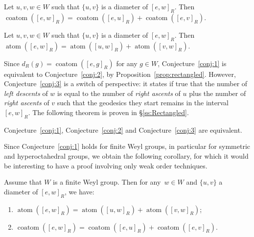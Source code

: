 \documentclass[Unicode]{cedram-alco}
\theoremstyle{definition}
\newcommand{\coatom}{\operatorname{coatom}}
\newcommand{\atom}{\operatorname{atom}}
\begin{document}
\begin{conj}\label{conj:2} Let $u,v,w\in W$ such that $\{u,v\}$ is a diameter of $[e,w]_R$. Then $\coatom([e,w]_R)= \coatom([e,u]_R) + \coatom([e,v]_R)$.
\end{conj} 

\begin{conj}\label{conj:3} Let $u,v,w\in W$ such that $\{u,v\}$ is a diameter of $[e,w]_R$. Then $\atom([e,w]_R)= \atom([u,w]_R) + \atom([v,w]_R)$.
\end{conj} 

Since $d_R(g)=\coatom([e,g]_R)$ for any $g\in W$, Conjecture~\ref{conj:1} is equivalent to Conjecture~\ref{conj:2}, by Proposition~\ref{prop:rectangled}. However, Conjecture~\ref{conj:3} is a switch of perspective: it states if true that the number of {\em left descents} of $w$ is equal to the number of {\em right ascents} of $u$ plus the number of {\em right ascents} of $v$ such that the geodesics they start remains in the interval $[e,w]_R$. The following theorem is proven in \S\ref{ss:Rectangled}.

\begin{thm}\label{thm:Equivalent} Conjecture~\ref{conj:1}, Conjecture~\ref{conj:2} and Conjecture~\ref{conj:3} are equivalent. 
\end{thm}

Since Conjecture~\ref{conj:1} holds for finite Weyl groups, in particular for symmetric and hyperoctahedral groups,  we obtain the following corollary, for which it would be interesting to have a proof involving only weak order techniques.

\begin{coro} Assume that $W$ is a finite Weyl group. Then for any~$w\in  W$ and $\{u,v\}$ a  diameter of $[e,w]_R$, we have:
\begin{enumerate}
\item $\atom([e,w]_R)= \atom([u,w]_R) + \atom([v,w]_R)$;
\item $\coatom([e,w]_R)= \coatom([e,u]_R) + \coatom([e,v]_R)$.
\end{enumerate}
\end{coro}
\end{document}
